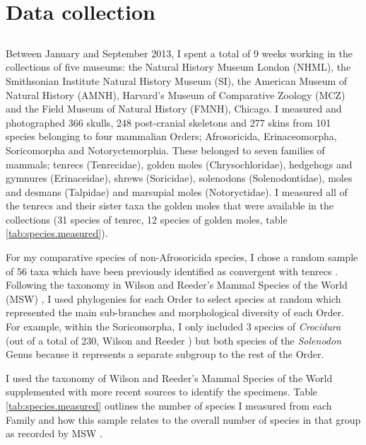 \section{Data collection}
\label{sect:datacollection}


\subsection{}

	Between January and September 2013, I spent a total of 9 weeks working in the collections of five museums: the Natural History Museum London (NHML), the Smithsonian Institute Natural History Museum (SI), the American Museum of Natural History (AMNH), Harvard's Museum of Comparative Zoology (MCZ) and the Field Museum of Natural History (FMNH), Chicago. I measured and photographed 366 skulls, 248 post-cranial skeletons and 277 skins from 101 species belonging to four mammalian Orders; Afrosoricida, Erinaceomorpha, Soricomorpha and Notoryctemorphia. 
	These belonged to seven families of mammals; tenrecs (Tenrecidae), golden moles (Chrysochloridae), hedgehogs and gymnures (Erinaceidae), shrews (Soricidae), solenodons (Solenodontidae), moles and desmans (Talpidae) and marsupial moles (Notoryctidae).
	I measured all of the tenrecs and their sister taxa the golden moles that were available in the collections (31 species of tenrec, 12 species of golden moles, table \ref{tab:species.measured}).
	
	For my comparative species of non-Afrosoricida species, I chose a random sample of 56 taxa 
	which have been previously identified as convergent with tenrecs \citep[e.g.][]{Gould1966, Symonds2005, Poux2008, Olson2013}. Following the taxonomy in Wilson and Reeder's Mammal Species of the World (MSW) \citeyearpar{Wilson2005}, I used phylogenies for each Order to select species at random which represented the main sub-branches and morphological diversity of each Order. For example, within the Soricomorpha, I only included 3 %
	species of \textit{Crocidura} (out of a total of 230, Wilson and Reeder \citeyear{Wilson2005}) but both species of the \textit{Solenodon} Genus because it represents a separate subgroup to the rest of the Order. 

	I used the taxonomy of Wilson and Reeder's Mammal Species of the World \citeyearpar[MSW,][]{Wilson2005} supplemented with more recent sources \citep[e.g.][]{Olson2013, Soarimalala2011} to identify the specimens. Table \ref{tab:species.measured} outlines the number of species I measured from each Family and how this sample relates to the overall number of species in that group as recorded by MSW \citeyearpar{Wilson2005}.

